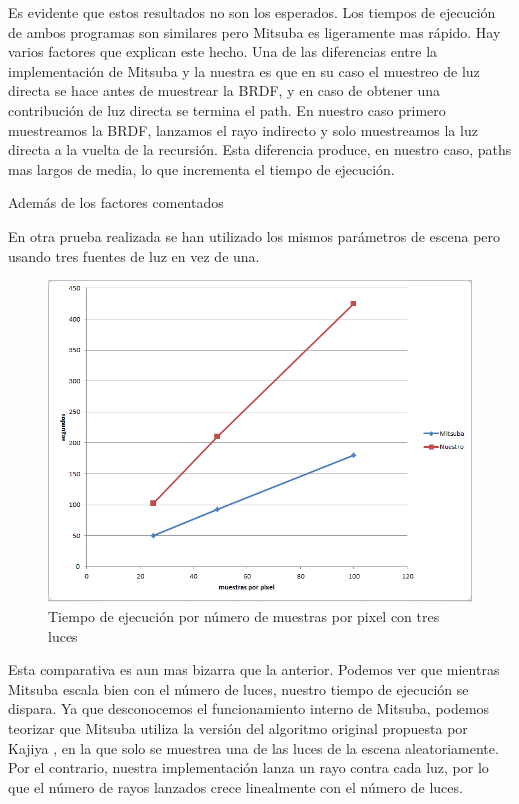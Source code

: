 Es evidente que estos resultados no son los esperados. Los tiempos de ejecución de ambos programas son similares pero Mitsuba es ligeramente mas rápido. Hay varios factores que explican este hecho. Una de las diferencias entre la implementación de Mitsuba  y la nuestra es que en su caso el muestreo de luz directa se hace antes de muestrear la BRDF, y en caso de obtener una contribución de luz directa se termina el path. En nuestro caso primero muestreamos la BRDF, lanzamos el rayo indirecto y solo muestreamos la luz directa a la vuelta de la recursión. Esta diferencia produce, en nuestro caso, paths mas largos de media, lo que incrementa el tiempo de ejecución.

\medskip

Además de los factores comentados 


\clearpage

En otra prueba realizada se han utilizado los mismos parámetros de escena pero usando tres fuentes de luz en vez de una. 

\begin{figure}[h]
\centering
\includegraphics[width=5in]{comparativa_2.png}
\caption{Tiempo de ejecución por número de muestras por pixel con tres luces}
\end{figure}

Esta comparativa es aun mas bizarra que la anterior. Podemos ver que mientras Mitsuba escala bien con el número de luces, nuestro tiempo de ejecución se dispara. Ya que desconocemos el funcionamiento interno de Mitsuba, podemos teorizar que Mitsuba utiliza la versión del algoritmo original propuesta por Kajiya \cite{Kajiya1986}, en la que solo se muestrea una de las luces de la escena aleatoriamente. Por el contrario, nuestra implementación lanza un rayo contra cada luz, por lo que el número de rayos lanzados crece linealmente con el número de luces. 

